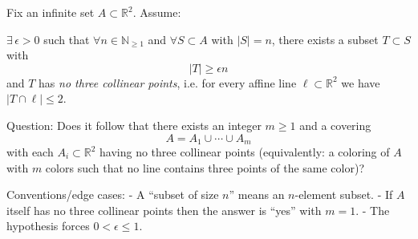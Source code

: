 Fix an infinite set $A\subset\mathbb{R}^2$. Assume:

$\exists\,\epsilon>0$ such that $\forall n\in\mathbb{N}_{\ge 1}$ and $\forall S\subset A$ with $|S|=n$, there exists a subset $T\subset S$ with
\[
|T|\ge \epsilon n
\]
and $T$ has \emph{no three collinear points}, i.e. for every affine line $\ell\subset\mathbb{R}^2$ we have $|T\cap \ell|\le 2$.

Question: Does it follow that there exists an integer $m\ge 1$ and a covering
\[
A = A_1\cup\cdots\cup A_m
\]
with each $A_i\subset\mathbb{R}^2$ having no three collinear points (equivalently: a coloring of $A$ with $m$ colors such that no line contains three points of the same color)?

Conventions/edge cases:
- A “subset of size $n$” means an $n$-element subset.
- If $A$ itself has no three collinear points then the answer is “yes” with $m=1$.
- The hypothesis forces $0<\epsilon\le 1$.
